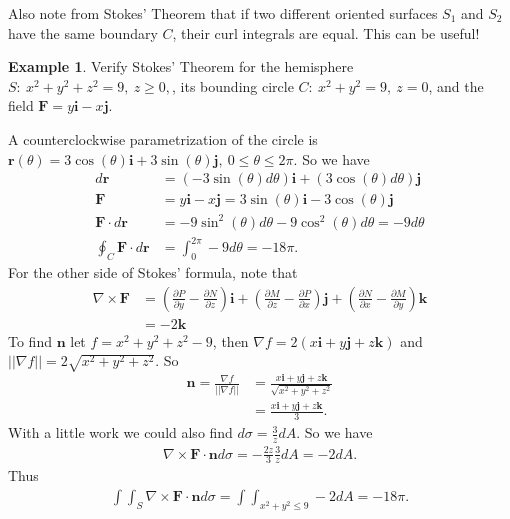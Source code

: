 \documentclass[12pt, letter]{article}
\theoremstyle{plain}
\numberwithin{theorem}{section}
\theoremstyle{definition}
\newtheorem{example}[theorem]{Example}
\begin{document}
\bigskip

\hrulefill

\bigskip

Also note from Stokes' Theorem that if two different oriented surfaces $S_1$ and $S_2$ have the same boundary $C$, their curl integrals are equal. This can be useful!

\bigskip

\hrulefill

\bigskip

\begin{example}
Verify Stokes' Theorem for the hemisphere $S: \ x^2+y^2+z^2=9, \ z\geq 0,$, its bounding circle $C: \ x^2+y^2=9, \ z=0$, and the field $\bm{F} = y\bm{i}-x\bm{j}$.

\bigskip

A counterclockwise parametrization of the circle is $\bm{r}(\theta) = 3\cos(\theta)\bm{i}+3\sin(\theta)\bm{j}, \ 0\leq \theta\leq 2\pi$. So we have
\begin{align*}
d\bm{r} &= (-3\sin(\theta)d\theta)\bm{i}+(3\cos(\theta)d\theta)\bm{j}\\
\bm{F} &= y\bm{i}-x\bm{j} = 3\sin(\theta)\bm{i}-3\cos(\theta)\bm{j}\\
\bm{F}\cdot d\bm{r} &= -9\sin^2(\theta)d\theta - 9\cos^2(\theta)d\theta = -9d\theta\\
\oint_C \bm{F}\cdot d\bm{r} &= \int_0^{2\pi} -9d\theta = -18\pi.
\end{align*}
For the other side of Stokes' formula, note that
\begin{align*}
\nabla \times \bm{F} &= \left(\frac{\partial P}{\partial y}-\frac{\partial N}{\partial z}\right)\bm{i}+\left(\frac{\partial M}{\partial z}-\frac{\partial P}{\partial x}\right)\bm{j}+\left(\frac{\partial N}{\partial x}-\frac{\partial M}{\partial y}\right)\bm{k}\\
&= -2\bm{k}
\end{align*}
To find $\bm{n}$ let $f=x^2+y^2+z^2-9$, then $\nabla f = 2(x\bm{i}+y\bm{j}+z\bm{k})$ and $||\nabla f|| = 2\sqrt{x^2+y^2+z^2}$. So
\begin{align*}
\bm{n} = \frac{\nabla f}{||\nabla f||} &= \frac{x\bm{i}+y\bm{j}+z\bm{k}}{\sqrt{x^2+y^2+z^2}}\\
&= \frac{x\bm{i}+y\bm{j}+z\bm{k}}{3}.
\end{align*}
With a little work we could also find $d\sigma = \frac{3}{z}dA$. So we have
\begin{align*}
\nabla \times \bm{F}\cdot\bm{n}d\sigma = -\frac{2z}{3}\frac{3}{z}dA = -2dA.
\end{align*}
Thus
\begin{align*}
\int\int_S \nabla \times \bm{F}\cdot\bm{n}d\sigma = \int\int_{x^2+y^2\leq 9} -2dA = -18\pi.
\end{align*}
\end{example}
\end{document}
